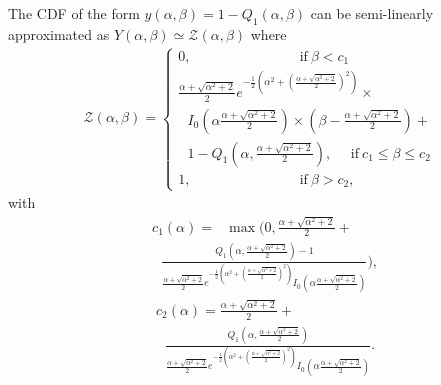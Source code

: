 \begin{lem}\label{Lemma1}
 The CDF of the form $y(\alpha, \beta ) = 1-Q_1(\alpha,\beta)$ can be semi-linearly approximated as $Y(\alpha,\beta)\simeq \mathcal{Z}(\alpha, \beta)$ where
\begin{align}\label{eq_lema1}
\mathcal{Z}(\alpha, \beta)=
\begin{cases}
0,  ~~~~~~~~~~~~~~~~~~~~~~~~~~~~~~~~~~~\mathrm{if}~ \beta < c_1  \\ 
 \frac{\alpha+\sqrt{\alpha^2+2}}{2} e^{-\frac{1}{2}\left(\alpha^2+\left(\frac{\alpha+\sqrt{\alpha^2+2}}{2}\right)^2\right)}\times\\
 ~~~I_0\left(\alpha\frac{\alpha+\sqrt{\alpha^2+2}}{2}\right)\times\left(\beta-\frac{\alpha+\sqrt{\alpha^2+2}}{2}\right)+\\
 ~~~1-Q_1\left(\alpha,\frac{\alpha+\sqrt{\alpha^2+2}}{2}\right),  ~~~~~~\mathrm{if}~ c_1 \leq\beta\leq c_2 \\
1,  ~~~~~~~~~~~~~~~~~~~~~~~~~~~~~~~~~~~\mathrm{if}~ \beta> c_2,
\end{cases}
\end{align}
with
\begin{align}\label{eq_c1}
  & c_1(\alpha) =~~~ \max\Bigg(0,\frac{\alpha+\sqrt{\alpha^2+2}}{2}+\nonumber\\
    &~~~\frac{Q_1\left(\alpha,\frac{\alpha+\sqrt{\alpha^2+2}}{2}\right)-1}{\frac{\alpha+\sqrt{\alpha^2+2}}{2} e^{-\frac{1}{2}\left(\alpha^2+\left(\frac{\alpha+\sqrt{\alpha^2+2}}{2}\right)^2\right)}I_0\left(\alpha\frac{\alpha+\sqrt{\alpha^2+2}}{2}\right)}\Bigg),
\end{align}
\begin{align}\label{eq_c2}
  & c_2(\alpha) = \frac{\alpha+\sqrt{\alpha^2+2}}{2}+\nonumber\\
  & ~~~\frac{Q_1\left(\alpha,\frac{\alpha+\sqrt{\alpha^2+2}}{2}\right)}{\frac{\alpha+\sqrt{\alpha^2+2}}{2} e^{-\frac{1}{2}\left(\alpha^2+\left(\frac{\alpha+\sqrt{\alpha^2+2}}{2}\right)^2\right)}I_0\left(\alpha\frac{\alpha+\sqrt{\alpha^2+2}}{2}\right)}.
\end{align}
\end{lem}
